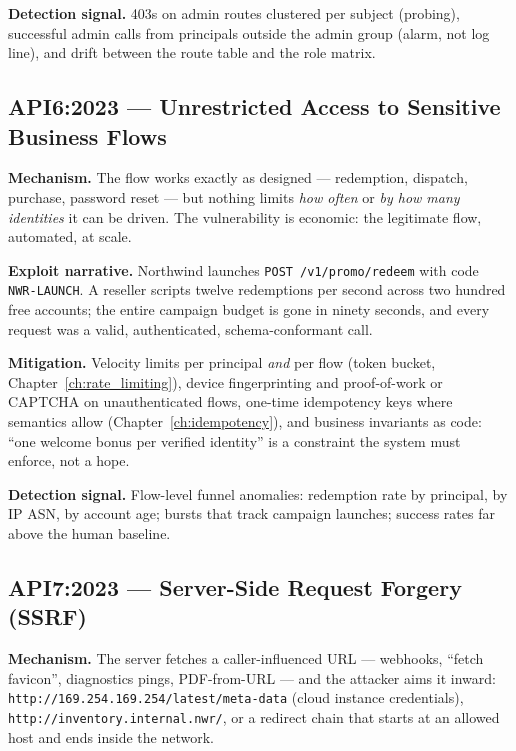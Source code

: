 \textbf{Detection signal.} 403s on admin routes clustered per subject
(probing), successful admin calls from principals outside the admin group
(alarm, not log line), and drift between the route table and the role
matrix.

\subsection{API6:2023 --- Unrestricted Access to Sensitive Business Flows}
\label{sec:ch16-api6}

\textbf{Mechanism.} The flow works exactly as designed --- redemption,
dispatch, purchase, password reset --- but nothing limits \emph{how often}
or \emph{by how many identities} it can be driven. The vulnerability is
economic: the legitimate flow, automated, at scale.

\textbf{Exploit narrative.} Northwind launches
\texttt{POST /v1/promo/redeem} with code \texttt{NWR-LAUNCH}. A reseller
scripts twelve redemptions per second across two hundred free accounts; the
entire campaign budget is gone in ninety seconds, and every request was a
valid, authenticated, schema-conformant call.

\textbf{Mitigation.} Velocity limits per principal \emph{and} per flow
(token bucket, Chapter~\ref{ch:rate_limiting}), device fingerprinting and
proof-of-work or CAPTCHA on unauthenticated flows, one-time idempotency
keys where semantics allow (Chapter~\ref{ch:idempotency}), and business
invariants as code: ``one welcome bonus per verified identity'' is a
constraint the system must enforce, not a hope.

\textbf{Detection signal.} Flow-level funnel anomalies: redemption rate by
principal, by IP ASN, by account age; bursts that track campaign launches;
success rates far above the human baseline.

\subsection{API7:2023 --- Server-Side Request Forgery (SSRF)}
\label{sec:ch16-api7}

\textbf{Mechanism.} The server fetches a caller-influenced URL ---
webhooks, ``fetch favicon'', diagnostics pings, PDF-from-URL --- and the
attacker aims it inward: \texttt{http://169.254.169.254/latest/meta-data}
(cloud instance credentials), \texttt{http://inventory.internal.nwr/}, or a
redirect chain that starts at an allowed host and ends inside the network.

